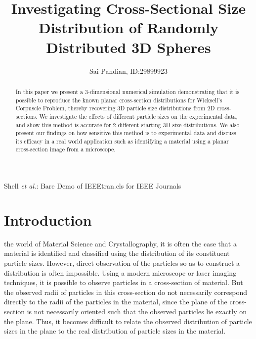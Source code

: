 \documentclass[journal]{IEEEtran}
\begin{document}
\title{Investigating Cross-Sectional Size Distribution of Randomly Distributed
       3D Spheres} 

\author{Sai Pandian, ID:\@ 29899923}%
        
{Shell \MakeLowercase{\textit{et al.}}: Bare Demo of IEEEtran.cls for IEEE Journals}

\maketitle

\begin{abstract}
  In this paper we present a 3-dimensional numerical simulation demonstrating
  that it is possible to reproduce the known planar cross-section distributions
  for Wicksell's Corpuscle Problem, thereby recovering 3D particle size
  distributions from 2D cross-sections. We investigate the effects of different
  particle sizes on the experimental data, and show this method is accurate for
  2 different starting 3D size distributions. We also present our findings on
  how sensitive this method is to experimental data and discuss its efficacy in
  a real world application such as identifying a material using a planar
  cross-section image from a microscope.
\end{abstract}

\section{Introduction}

 the world of Material Science and Crystallography, it is
often the case that a material is identified and classified using the
distribution of its constituent particle sizes. However, direct observation of
the particles so as to construct a distribution is often impossible. Using a
modern microscope or laser imaging techniques, it is possible to observe
particles in a cross-section of material. But the observed radii of particles in
this cross-section do not necessarily correspond directly to the radii of the
particles in the material, since the plane of the cross-section is not
necessarily oriented such that the observed particles lie exactly on the
plane. Thus, it becomes difficult to relate the observed distribution of
particle sizes in the plane to the real distribution of particle sizes in the
material.
\end{document}
